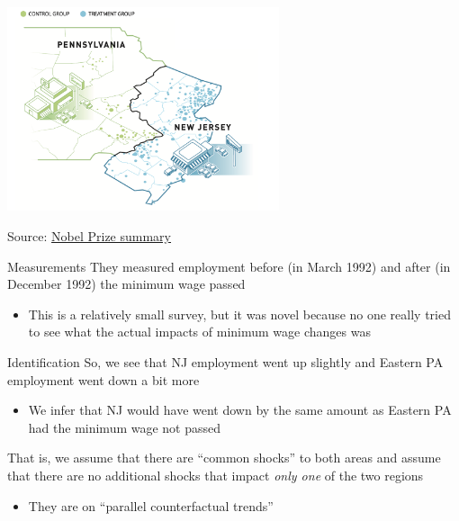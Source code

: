 \documentclass[aspectratio=169,t,11pt,table]{beamer}
\begin{document}
\begin{frame}{}
  \begin{center}
    \includegraphics[width= 0.6\textwidth]{figures/minimum_wage_illustration.png}
    
    Source: \href{https://www.nobelprize.org/uploads/2021/10/fig3_ek_en_21_effectIncreasingMinimunWage.pdf}{Nobel Prize summary} 
  \end{center}
\end{frame}

\begin{frame}{Measurements}
  They measured employment before (in March 1992) and after (in December 1992) the minimum wage passed
  \begin{itemize}
    \item This is a relatively small survey, but it was novel because no one really tried to see what the actual impacts of minimum wage changes was
  \end{itemize}
\end{frame}


\begin{frame}{Identification}
  So, we see that NJ employment went up slightly and Eastern PA employment went down a bit more
  \begin{itemize}
    \item We infer that NJ would have went down by the same amount as Eastern PA had the minimum wage not passed 
  \end{itemize}

  \bigskip
  That is, we assume that there are ``common shocks'' to both areas and assume that there are no additional shocks that impact \emph{only one} of the two regions
  \begin{itemize}
    \item They are on ``parallel counterfactual trends''
  \end{itemize}
\end{frame}
\end{document}

